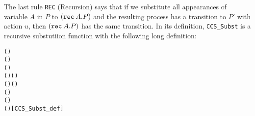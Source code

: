 The last rule \texttt{REC} (Recursion)
 says that if we substitute all appearances of variable $A$ in $P$ to
$({\tt rec}\: A . P)$ and the resulting process has a transition to $P'$
with action $u$, then $({\tt rec}\: A . P)$ has the same
transition. In its definition, \texttt{CCS_Subst} is a recursive substutiion function
with the following long definition:
\begin{alltt}
    \HOLSymConst{\HOLTokenDefEquality{}} 
 ()   \HOLSymConst{\HOLTokenDefEquality{}}    
 ( \HOLSymConst{\ensuremath{+}} )   \HOLSymConst{\HOLTokenDefEquality{}}
      \HOLSymConst{\ensuremath{+}}    
 ( \HOLSymConst{\ensuremath{\parallel}} )   \HOLSymConst{\HOLTokenDefEquality{}}
      \HOLSymConst{\ensuremath{\parallel}}    
 (\HOLSymConst{\ensuremath{\nu}}  )   \HOLSymConst{\HOLTokenDefEquality{}} \HOLSymConst{\ensuremath{\nu}}  (   )
 (  )   \HOLSymConst{\HOLTokenDefEquality{}}  (   ) 
 ( )   \HOLSymConst{\HOLTokenDefEquality{}}   \HOLSymConst{=}      
 (  )   \HOLSymConst{\HOLTokenDefEquality{}}
    \HOLSymConst{=}         (   )\hfill{[CCS_Subst_def]}
\end{alltt}

